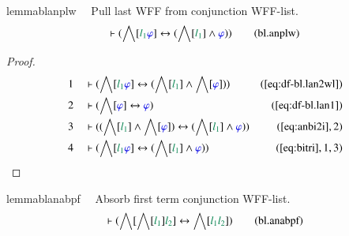 \begin{restatable}{lemma}{blanplw}~~ Pull last WFF from conjunction WFF-list.
\begin{align}
\vdash ( \bigwedge[ \mwl{l_1} \mw{\varphi} ] \leftrightarrow ( \bigwedge[
    \mwl{l_1} ] \wedge \mw{\varphi} ) )\label{eq:bl.anplw}\tag{bl.anplw}
\end{align}
\end{restatable}

\begin{proof}
\begin{align}
  1 &&  & \vdash ( \bigwedge[ \mwl{l_1} \mw{\varphi} ] \leftrightarrow (
      \bigwedge[ \mwl{l_1} ] \wedge \bigwedge[ \mw{\varphi}
      ] ) )&(\mbox{\ref{eq:df-bl.lan2wl}})\notag
  \\ 2 &&  & \vdash ( \bigwedge[ \mw{\varphi} ] \leftrightarrow \mw{\varphi}
      )&(\mbox{\ref{eq:df-bl.lan1}})\notag
  \\ 3 &&  & \vdash ( ( \bigwedge[ \mwl{l_1} ] \wedge \bigwedge[ \mw{\varphi} ]
      ) \leftrightarrow ( \bigwedge[ \mwl{l_1} ] \wedge
      \mw{\varphi} ) )&(\mbox{\ref{eq:anbi2i}},2)\notag
  \\ 4 &&  & \vdash ( \bigwedge[ \mwl{l_1} \mw{\varphi} ] \leftrightarrow (
      \bigwedge[ \mwl{l_1} ] \wedge \mw{\varphi} )
      )&(\mbox{\ref{eq:bitri}},1,3)\notag
\end{align}
\end{proof}

\begin{restatable}{lemma}{blanabpf}~~ Absorb first term conjunction WFF-list.
\begin{align}
\vdash ( \bigwedge[ \bigwedge[ \mwl{l_1} ] \mwl{l_2} ] \leftrightarrow
    \bigwedge[ \mwl{l_1} \mwl{l_2} ] )\label{eq:bl.anabpf}\tag{bl.anabpf}
\end{align}
\end{restatable}


